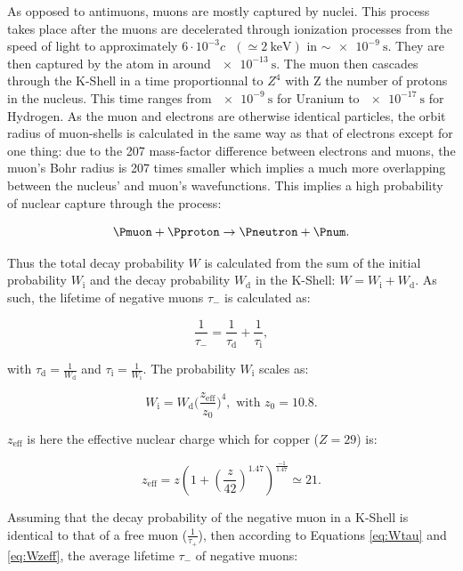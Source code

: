 As opposed to antimuons, muons are mostly captured by nuclei. This process takes place after the muons are decelerated through ionization processes from the speed of light to approximately $6\cdot10^{-3}c\text{ }(\simeq\SI{2}{\kilo\electronvolt})$ in $\sim \SI{e-9}{\second}$. They are then captured by the atom in around $\SI{e-13}{\second}$. The muon then cascades through the K-Shell in a time proportionnal to $Z^4$ with Z the number of protons in the nucleus. This time ranges from $\SI{e-9}{\second}$ for Uranium to $\SI{e-17}{\second}$ for Hydrogen. As the muon and electrons are otherwise identical particles, the orbit radius of muon-shells is calculated in the same way as that of electrons except for one thing: due to the 207 mass-factor difference between electrons and muons, the muon's Bohr radius is 207 times smaller which implies a much more overlapping between the nucleus' and muon's wavefunctions. This implies a high probability of nuclear capture through the process:

\begin{equation}
\Pmuon + \Pproton \rightarrow \Pneutron + \Pnum.
\end{equation}

Thus the total decay probability $W$ is calculated from the sum of the initial probability $W_{\text{i}}$ and the decay probability $W_{\text{d}}$ in the K-Shell: $W=W_{\text{i}}+W_{\text{d}}$. As such, the lifetime of negative muons $\tau_-$ is calculated as:

\begin{equation}
\label{eq:Wtau}
\frac{1}{\tau_-}=\frac{1}{\tau_{\text{d}}}+\frac{1}{\tau_{\text{i}}},
\end{equation}

with $\tau_{\text{d}}=\frac{1}{W_{\text{d}}}$ and $\tau_{\text{i}}=\frac{1}{W_{\text{i}}}$. The probability $W_{\text{i}}$ scales as:

\begin{equation}
\label{eq:Wzeff}
W_{\text{i}}=W_{\text{d}}\Big( \frac{z_{\text{eff}}}{z_0}\Big)^4, \text{ with } z_0=10.8.
\end{equation}

$z_{\text{eff}}$ is here the effective nuclear charge which for copper ($Z=29$) is:

\begin{equation}
z_{\text{eff}}=z(1+(\frac{z}{42})^{1.47})^{\frac{-1}{1.47}}\simeq 21.
\end{equation}

Assuming that the decay probability of the negative muon in a K-Shell is identical to that of a free muon ($\frac{1}{\tau_{+}}$), then according to Equations \ref{eq:Wtau} and \ref{eq:Wzeff}, the average lifetime $\tau_-$ of negative muons:

